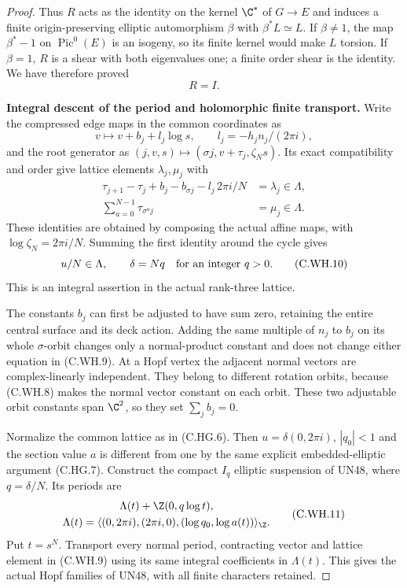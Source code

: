 \begin{proof}
Thus $R$ acts as the identity on
the kernel $\C^*$ of $G\to E$
and induces a finite origin-preserving
elliptic automorphism $\beta$ with
$\beta^*L\simeq L$. If $\beta\ne1$,
the map $\beta^*-1$ on
$\operatorname{Pic}^0(E)$ is an
isogeny, so its finite kernel
would make $L$ torsion. If
$\beta=1$, $R$ is a shear with
both eigenvalues one; a finite
order shear is the identity.
We have therefore proved
\[
                              R=I.
\tag{C.WH.8}
\]

\par\medskip\noindent\textbf{Integral descent of the period and holomorphic finite transport.}
Write the compressed edge maps in
the common coordinates as
\[
 v\longmapsto v+b_j+l_j\log s,
 \qquad l_j=-h_jn_j/(2\pi i),
\]
and the root generator as
$(j,v,s)\mapsto(\sigma j,v+\tau_j,\zeta_Ns)$.
Its exact compatibility and order give
lattice elements $\lambda_j,\mu_j$ with
\[
 \begin{aligned}
 \tau_{j+1}-\tau_j+b_j-b_{\sigma j}
                   -l_j\,2\pi i/N&=\lambda_j\in\Lambda,\\
 \sum_{a=0}^{N-1}\tau_{\sigma^a j}&=\mu_j\in\Lambda.
 \end{aligned}
\tag{C.WH.9}
\]
These identities are obtained by composing
the actual affine maps, with
$\log\zeta_N=2\pi i/N$.
Summing the first identity around the
cycle gives
\[
                   u/N\in\Lambda,\qquad
                 \delta=Nq\quad\hbox{for an integer }q>0.
\tag{C.WH.10}
\]
This is an integral assertion in the
actual rank-three lattice.

The constants $b_j$ can first be
adjusted to have sum zero, retaining
the entire central surface and its
deck action. Adding the same multiple
of $n_j$ to $b_j$ on its whole
$\sigma$-orbit changes only a
normal-product constant and does
not change either equation in
(C.WH.9). At a Hopf vertex the
adjacent normal vectors are
complex-linearly independent.
They belong to different rotation
orbits, because (C.WH.8) makes
the normal vector constant on
each orbit. These two adjustable
orbit constants span $\C^2$,
so they set $\sum_j b_j=0$.

Normalize the common lattice as in
(C.HG.6). Then $u=\delta(0,2\pi i)$,
$|q_0|<1$ and the section value
$a$ is different from one by the
same explicit embedded-elliptic
argument (C.HG.7).
Construct the compact $I_q$
elliptic suspension of UN48,
where $q=\delta/N$. Its periods are
\[
 \begin{gathered}
 \Lambda(t)+\Z(0,q\log t),\\
 \Lambda(t)=
 \langle(0,2\pi i),(2\pi i,0),
                       (\log q_0,\log a(t))\rangle_{\Z} .
 \end{gathered}
\tag{C.WH.11}
\]
Put $t=s^N$. Transport every normal
period, contracting vector and
lattice element in (C.WH.9) using
its same integral coefficients in
$\Lambda(t)$. This gives the actual
Hopf families of UN48, with all
finite characters retained.


\end{proof}
